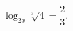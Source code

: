 \begin{ex}[type=equation]
	\begin{condition}
		$\log_{2x} \sqrt[3]{4} = \dfrac{2}{3}.$
	\end{condition}
\end{ex}